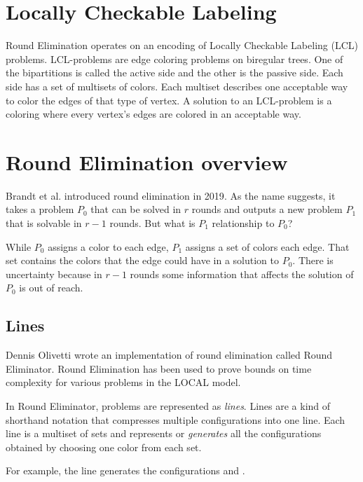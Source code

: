 \documentclass[english, 12pt, a4paper, sci, utf8, a-1b, online]{aaltothesis}
\begin{document}
\section{Locally Checkable Labeling}

Round Elimination operates on an encoding of Locally Checkable Labeling (LCL) problems. LCL-problems are edge coloring problems on biregular trees. One of the bipartitions is called the active side and the other is the passive side. Each side has a set of multisets of colors. Each multiset describes one acceptable way to color the edges of that type of vertex. A solution to an LCL-problem is a coloring where every vertex's edges are colored in an acceptable way.


\section{Round Elimination overview}

Brandt et al. introduced round elimination in 2019\cite{speedup}. As the name suggests, it takes a problem $P_0$ that can be solved in $r$ rounds and outputs a new problem $P_1$ that is solvable in $r-1$ rounds. But what is $P_1$ relationship to $P_0$?

While $P_0$ assigns a color to each edge, $P_1$ assigns a set of colors each edge. That set contains the colors that the edge could have in a solution to $P_0$. There is uncertainty because in $r-1$ rounds some information that affects the solution of $P_0$ is out of reach.

\subsection{Lines}

Dennis Olivetti wrote an implementation of round elimination called Round Eliminator\cite{RE}. Round Elimination has been used to prove bounds on time complexity for various problems in the LOCAL model\cite{tc1, tc2, tc3}.

In Round Eliminator, problems are represented as \emph{lines}. Lines are a kind of shorthand notation that compresses multiple configurations into one line. Each line is a multiset of sets and represents or \emph{generates} all the configurations obtained by choosing one color from each set.\cite{RE}

For example, the line  generates the configurations  and .
\end{document}

